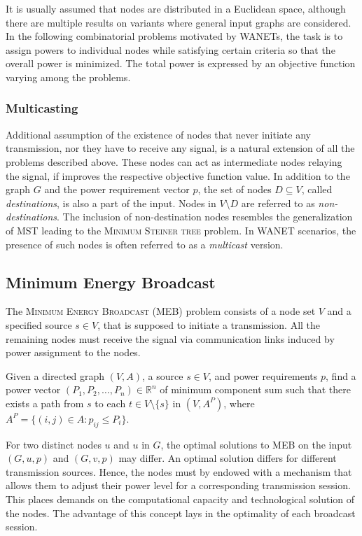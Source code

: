 It is usually assumed that nodes are distributed in a Euclidean space, although there are multiple results on variants where general input graphs are considered.
In the following combinatorial problems motivated by WANETs, the task is to assign powers to individual nodes while satisfying certain criteria so that the overall power is minimized.
The total power is expressed by an objective function varying among the problems.

\subsubsection{Multicasting}

Additional assumption of the existence of nodes that never initiate any transmission, nor they have to receive any signal, is a natural extension of all the problems described above.
These nodes can act as intermediate nodes relaying the signal, if improves the respective objective function value.
In addition to the graph $G$ and the power requirement vector $p$, the set of nodes $D\subseteq V$, called \emph{destinations}, is also a part of the input.
Nodes in $V\setminus D$ are referred to as \emph{non-destinations}.
The inclusion of non-destination nodes resembles the generalization of MST leading to the \textsc{Minimum Steiner tree} problem.
In WANET scenarios, the presence of such nodes is often referred to as a \emph{multicast} version.

\subsection{Minimum Energy Broadcast}

The \textsc{Minimum Energy Broadcast} (MEB) problem consists of a node set $V$ and a specified source $s\in V$, that is supposed to initiate a transmission.
All the remaining nodes must receive the signal via communication links induced by power assignment to the nodes.
\begin{problem}\label{prob:meb1}
Given a directed graph $(V,A)$, a source $s\in V$, and power requirements $p$, find a power vector $(P_1,P_2,\dots,P_n)\in\mathbb{R}^n$ of minimum component sum such that
there exists a path from $s$ to each $t\in V\setminus\{s\}$ in $(V,A^P)$, where $A^P=\{(i,j)\in A: p_{ij}\leq P_i\}$.
\end{problem}
For two distinct nodes $u$ and $u$  in $G$, the optimal solutions to MEB on the input $(G,u,p)$ and $(G,v,p)$ may differ.
An optimal solution differs for different transmission sources.
Hence, the nodes must by endowed with a mechanism that allows them to adjust their power level for a corresponding transmission session.
This places demands on the computational capacity and technological solution of the nodes.
The advantage of this concept lays in the optimality of each broadcast session.

